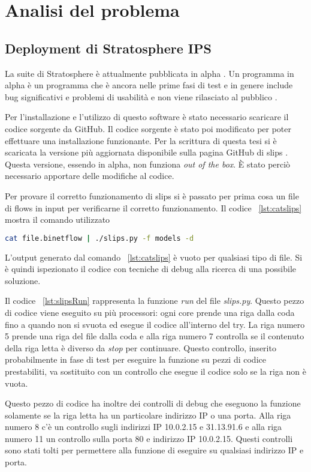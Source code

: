\documentclass[../main.tex]{subfiles}
\begin{document}
\section{Analisi del problema}

\subsection{Deployment di Stratosphere IPS}
La suite di Stratosphere è attualmente pubblicata in alpha \cite{stratosphereSuite}. Un programma in alpha è un programma che è ancora nelle prime fasi di test e in genere include bug significativi e problemi di usabilità e non viene rilasciato al pubblico \cite{alpha}.

Per l'installazione e l'utilizzo di questo software è stato necessario scaricare il codice sorgente da GitHub. Il codice sorgente è stato poi modificato per poter effettuare una installazione funzionante.
Per la scrittura di questa tesi si è scaricata la versione più aggiornata disponibile sulla pagina GitHub di slips \cite{slipscurrent}. Questa versione, essendo in alpha, non funziona \textit{out of the box}. È stato perciò necessario apportare delle modifiche al codice.

Per provare il corretto funzionamento di slips si è passato per prima cosa un file di flows in input per verificarne il corretto funzionamento. Il codice ~\ref{lst:catslips} mostra il comando utilizzato 
\begin{lstlisting}[language=Bash, label={lst:catslips}, caption={comando per eseguire slips}]
cat file.binetflow | ./slips.py -f models -d
\end{lstlisting}
L'output generato dal comando ~\ref{lst:catslips} è vuoto per qualsiasi tipo di file. Si è quindi ispezionato il codice con tecniche di debug alla ricerca di una possibile soluzione.

Il codice ~\ref{lst:slipsRun} rappresenta la funzione \textit{run} del file \textit{slips.py}. Questo pezzo di codice viene eseguito su più processori: ogni core prende una riga dalla coda fino a quando non si svuota ed esegue il codice all'interno del try.
La riga numero 5 prende una riga del file dalla coda e alla riga numero 7 controlla se il contenuto della riga letta è diverso da \textit{stop} per continuare. Questo controllo, inserito probabilmente in fase di test per eseguire la funzione su pezzi di codice prestabiliti, va sostituito con un controllo che esegue il codice solo se la riga non è vuota.

Questo pezzo di codice ha inoltre dei controlli di debug che eseguono la funzione solamente se la riga letta ha un particolare indirizzo IP o una porta. Alla riga numero 8 c'è un controllo sugli indirizzi IP 10.0.2.15 e 31.13.91.6 e alla riga numero 11 un controllo sulla porta 80 e indirizzo IP 10.0.2.15. Questi controlli sono stati tolti per permettere alla funzione di eseguire su qualsiasi indirizzo IP e porta.
\end{document}
